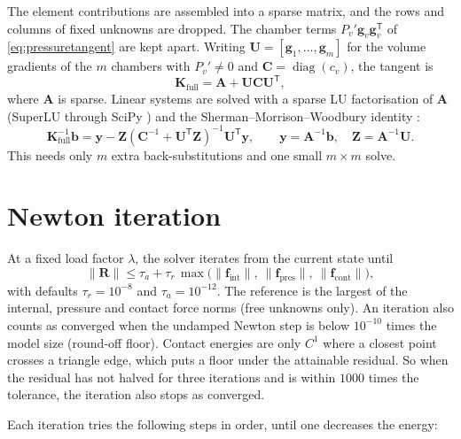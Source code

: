 \documentclass[11pt,a4paper]{article}
\newcommand{\vect}[1]{\bm{#1}}
\newcommand{\R}{\vect{R}}
\newcommand{\K}{\mathbf{K}}
\newcommand{\g}{\vect{g}}
\DeclareMathOperator{\diag}{diag}
\theoremstyle{remark}
\begin{document}
The element contributions are assembled into a sparse matrix, and the rows and columns of fixed
unknowns are dropped. The chamber terms $P_v'\g_v\g_v^{\mathsf T}$ of
\eqref{eq:pressuretangent} are kept apart. Writing $\mathbf{U} = [\g_1,\dots,\g_m]$ for the
volume gradients of the $m$ chambers with $P_v'\neq0$ and $\mathbf{C} = \diag(c_v)$, the tangent
is
\begin{equation}
\K_{\text{full}} = \mathbf{A} + \mathbf{U}\mathbf{C}\mathbf{U}^{\mathsf T},
\end{equation}
where $\mathbf{A}$ is sparse. Linear systems are solved with a sparse LU factorisation of
$\mathbf{A}$ (SuperLU through SciPy \cite{virtanen2020}) and the Sherman--Morrison--Woodbury
identity \cite{hager1989}:
\begin{equation}\label{eq:woodbury}
\K_{\text{full}}^{-1}\vect{b} = \vect{y} - \mathbf{Z}\left(\mathbf{C}^{-1} + \mathbf{U}^{\mathsf T}\mathbf{Z}\right)^{-1}\mathbf{U}^{\mathsf T}\vect{y},
\qquad \vect{y} = \mathbf{A}^{-1}\vect{b},\quad \mathbf{Z} = \mathbf{A}^{-1}\mathbf{U}.
\end{equation}
This needs only $m$ extra back-substitutions and one small $m\times m$ solve.

\section{Newton iteration}\label{sec:newton}

At a fixed load factor $\lambda$, the solver iterates from the current state until
\begin{equation}
\|\R\| \le \tau_a + \tau_r\,\max\big(\|\vect{f}_{\text{int}}\|,\ \|\vect{f}_{\text{pres}}\|,\ \|\vect{f}_{\text{cont}}\|\big),
\end{equation}
with defaults $\tau_r = 10^{-8}$ and $\tau_a = 10^{-12}$. The reference is the largest of the
internal, pressure and contact force norms (free unknowns only). An iteration also counts as
converged when the undamped Newton step is below $10^{-10}$ times the model size (round-off
floor). Contact energies are only $C^1$ where a closest point crosses a triangle edge, which puts
a floor under the attainable residual. So when the residual has not halved for three iterations
and is within $1000$ times the tolerance, the iteration also stops as converged.

Each iteration tries the following steps in order, until one decreases the energy:
\end{document}
